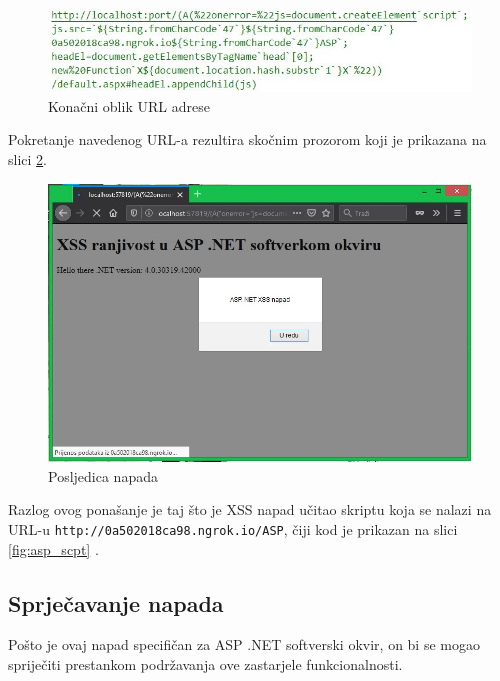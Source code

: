 \documentclass[12pt, oneside, onecolumn]{book}
\begin{document}
{\begin{figure}[H]
	\begin{center}
		\includegraphics[width=\textwidth]{asp_final.jpg}
		\caption{Konačni oblik URL adrese} \label{fig:asp_final}
	\end{center}
\end{figure}

Pokretanje navedenog URL-a rezultira skočnim prozorom koji je prikazana na slici \ref{fig:asp_atc}.

\begin{figure}[H]
	\begin{center}
		\includegraphics[width=\textwidth]{asp_atc.jpg}
		\caption{Posljedica napada} \label{fig:asp_atc}
	\end{center}
\end{figure}

Razlog ovog ponašanje je taj što je XSS napad učitao skriptu koja se nalazi na URL-u \texttt{http://0a502018ca98.ngrok.io/ASP}, čiji kod je prikazan na slici \ref{fig:asp_scpt} \cite{annapad}.

\subsection{Sprječavanje napada}
Pošto je ovaj napad specifičan za ASP .NET softverski okvir, on bi se mogao spriječiti prestankom podržavanja ove zastarjele funkcionalnosti.

}
\end{document}
